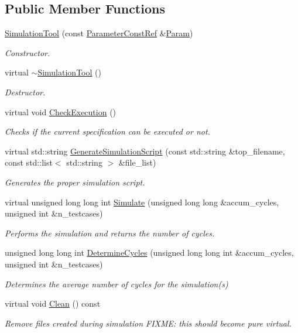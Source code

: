 \subsection*{Public Member Functions}
\begin{DoxyCompactItemize}
\item 
\hyperlink{classSimulationTool_ab33ce104c4f79adddbc2b57e3201a799}{Simulation\+Tool} (const \hyperlink{Parameter_8hpp_a37841774a6fcb479b597fdf8955eb4ea}{Parameter\+Const\+Ref} \&\hyperlink{classSimulationTool_adc409fd8f18901e2d0ea4a6ab6690138}{Param})
\begin{DoxyCompactList}\small\item\em Constructor. \end{DoxyCompactList}\item 
virtual \hyperlink{classSimulationTool_a51b21f23f26db8bfcbe9dc18d992a3ea}{$\sim$\+Simulation\+Tool} ()
\begin{DoxyCompactList}\small\item\em Destructor. \end{DoxyCompactList}\item 
virtual void \hyperlink{classSimulationTool_a24b4cde0b09c7496918d20f3896989b6}{Check\+Execution} ()
\begin{DoxyCompactList}\small\item\em Checks if the current specification can be executed or not. \end{DoxyCompactList}\item 
virtual std\+::string \hyperlink{classSimulationTool_a7fde58cff0f6cf25ae672c148e708c06}{Generate\+Simulation\+Script} (const std\+::string \&top\+\_\+filename, const std\+::list$<$ std\+::string $>$ \&file\+\_\+list)
\begin{DoxyCompactList}\small\item\em Generates the proper simulation script. \end{DoxyCompactList}\item 
virtual unsigned long long int \hyperlink{classSimulationTool_a1686af5b980c7e8dfa848ff616384627}{Simulate} (unsigned long long \&accum\+\_\+cycles, unsigned int \&n\+\_\+testcases)
\begin{DoxyCompactList}\small\item\em Performs the simulation and returns the number of cycles. \end{DoxyCompactList}\item 
unsigned long long int \hyperlink{classSimulationTool_a8e8df618d62095f1f87bc4b61282c563}{Determine\+Cycles} (unsigned long long int \&accum\+\_\+cycles, unsigned int \&n\+\_\+testcases)
\begin{DoxyCompactList}\small\item\em Determines the average number of cycles for the simulation(s) \end{DoxyCompactList}\item 
virtual void \hyperlink{classSimulationTool_a200fbae071dc751132117e922cf8ffc3}{Clean} () const
\begin{DoxyCompactList}\small\item\em Remove files created during simulation F\+I\+X\+ME\+: this should become pure virtual. \end{DoxyCompactList}\end{DoxyCompactItemize}
